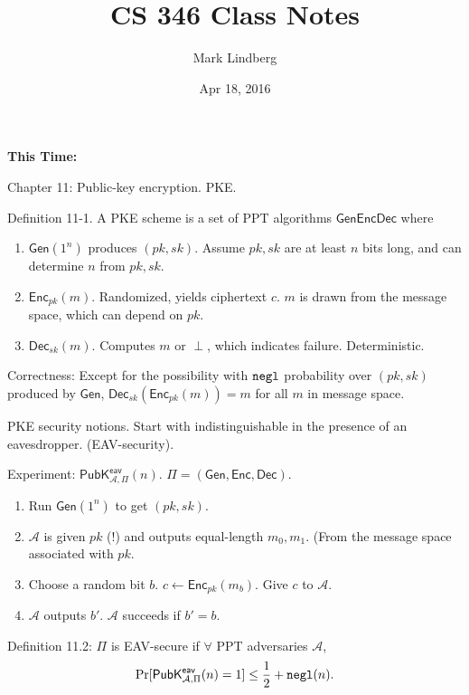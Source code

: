 \documentclass[12pt]{article}
\newcommand{\AAA}{\mathcal{A}}
\newcommand{\Enc}{\mathsf{Enc}}
\newcommand{\Dec}{\mathsf{Dec}}
\newcommand{\Gen}{\mathsf{Gen}}
\newcommand{\GenEncDec}{(\Gen,\Enc,\Dec)}
\newcommand{\ExptPubEavArgs}[2]{\mathsf{PubK}^{\mathsf{eav}}_{#1,#2}}
\newcommand{\ExptPubEav}{\ExptPubEavArgs{\AAA}{\Pi}}
\newcommand{\negl}{{\tt negl}}
\newcommand{\from}{\leftarrow}
\begin{document}
\title{CS 346 Class Notes}
\date{Apr 18, 2016}
\author{Mark Lindberg}
\maketitle
\thispagestyle{fancy}

{\bf This Time:}

Chapter 11: Public-key encryption. PKE.

Definition 11-1. A PKE scheme is a set of PPT algorithms $\Gen\Enc\Dec$ where\begin{enumerate}

\item $\Gen(1^n)$ produces $(pk, sk)$. Assume $pk, sk$ are at least $n$ bits long, and can determine $n$ from $pk, sk$.

\item $\Enc_{pk}(m)$. Randomized, yields ciphertext $c$. $m$ is drawn from the message space, which can depend on $pk$.

\item $\Dec_{sk}(m)$. Computes $m$ or $\perp$, which indicates failure. Deterministic.

\end{enumerate}

Correctness: Except for the possibility with $\negl$ probability over $(pk,sk)$ produced by $\Gen$, $\Dec_{sk}(\Enc_{pk}(m))=m$ for all $m$ in message space.

PKE security notions. Start with indistinguishable in the presence of an eavesdropper. (EAV-security).

Experiment: $\ExptPubEav(n)$. $\Pi=\GenEncDec$.\begin{enumerate}

\item Run $\Gen(1^n)$ to get $(pk,sk)$.

\item $\AAA$ is given $pk$ (!) and outputs equal-length $m_0,m_1$. (From the message space associated with $pk$.

\item Choose a random bit $b$. $c\from\Enc_{pk}(m_b)$. Give $c$ to $\AAA$.

\item $\AAA$ outputs $b'$. $\AAA$ succeeds if $b'=b$.

\end{enumerate}

Definition 11.2: $\Pi$ is EAV-secure if $\forall$ PPT adversaries $\AAA$, $$\Pr[\ExptPubEav(n)=1]\leq\frac{1}{2}+\negl(n).$$
\end{document}
